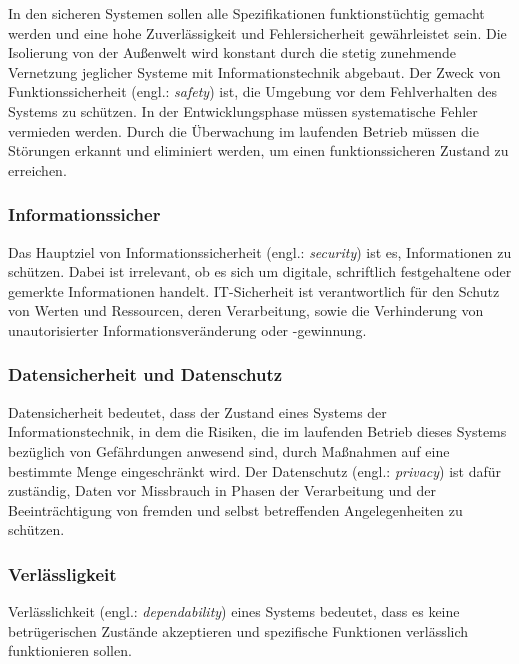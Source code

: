 In den sicheren Systemen sollen alle Spezifikationen funktionstüchtig gemacht werden und eine hohe Zuverlässigkeit und Fehlersicherheit gewährleistet sein. Die Isolierung von der Außenwelt wird konstant durch die stetig zunehmende Vernetzung jeglicher Systeme mit Informationstechnik abgebaut. Der Zweck von Funktionssicherheit (engl.: \textit{safety}) ist, die Umgebung vor dem Fehlverhalten des Systems zu schützen. In der Entwicklungsphase müssen systematische Fehler vermieden werden. Durch die Überwachung im laufenden Betrieb müssen die Störungen erkannt und eliminiert werden, um einen funktionssicheren Zustand zu erreichen\cite{hoepner2014trends}.

\subsubsection{Informationssicher}

Das Hauptziel von Informationssicherheit (engl.: \textit{security}) ist es, Informationen zu schützen. Dabei ist irrelevant, ob es sich um digitale, schriftlich festgehaltene oder gemerkte Informationen handelt. IT-Sicherheit ist verantwortlich für den Schutz von Werten und Ressourcen, deren Verarbeitung\cite[81]{int11sicher}, sowie die Verhinderung von unautorisierter Informationsveränderung oder -gewinnung\cite[26]{eckert2013sicherheit}.

\subsubsection{Datensicherheit und Datenschutz}

Datensicherheit bedeutet, dass der Zustand eines Systems der Informationstechnik, in dem die Risiken, die im laufenden Betrieb dieses Systems bezüglich von Gefährdungen anwesend sind, durch Maßnahmen auf eine bestimmte Menge eingeschränkt wird. Der Datenschutz (engl.: \textit{privacy}) ist dafür zuständig, Daten vor Missbrauch in Phasen der Verarbeitung und der Beeinträchtigung von fremden und selbst betreffenden Angelegenheiten zu schützen\cite[14--15]{eberspacher1994sichere}.

\subsubsection{Verlässligkeit}

Verlässlichkeit (engl.: \textit{dependability}) eines Systems bedeutet, dass es keine betrügerischen Zustände akzeptieren und spezifische Funktionen verlässlich funktionieren sollen\cite[27]{eckert2013sicherheit}.

